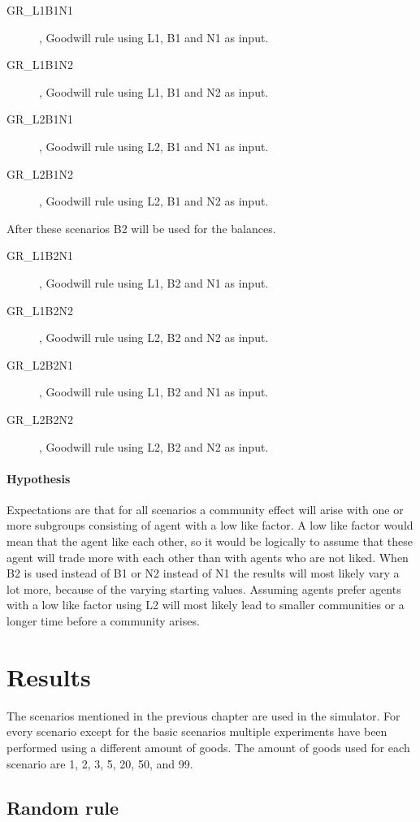 \documentclass[twoside,openright]{uva-bachelor-thesis}
\begin{document}
\begin{description}
\item[GR\_L1B1N1], Goodwill rule using L1, B1 and N1 as input.
\item[GR\_L1B1N2], Goodwill rule using L1, B1 and N2 as input.
\item[GR\_L2B1N1], Goodwill rule using L2, B1 and N1 as input.
\item[GR\_L2B1N2], Goodwill rule using L2, B1 and N2 as input.
\end{description}
After these scenarios B2 will be used for the balances.
\begin{description}
\item[GR\_L1B2N1], Goodwill rule using L1, B2 and N1 as input.
\item[GR\_L1B2N2], Goodwill rule using L2, B2 and N2 as input.
\item[GR\_L2B2N1], Goodwill rule using L1, B2 and N1 as input.
\item[GR\_L2B2N2], Goodwill rule using L2, B2 and N2 as input.
\end{description}

\subsubsection{Hypothesis}
Expectations are that for all scenarios a community effect will arise with one or more subgroups consisting of agent with a low like factor. A low like factor would mean that the agent like each other, so it would be logically to assume that these agent will trade more with each other than with agents who are not liked. When B2 is used instead of B1 or N2 instead of N1 the results will most likely vary a lot more, because of the varying starting values. Assuming agents prefer agents with a low like factor using L2 will most likely lead to smaller communities or a longer time before a community arises.



\chapter{Results}
The scenarios mentioned in the previous chapter are used in the simulator. For every scenario except for the basic scenarios multiple experiments have been performed using a different amount of goods. The amount of goods used for each scenario are 1, 2, 3, 5, 20, 50, and 99.

\section{Random rule}
\end{document}
